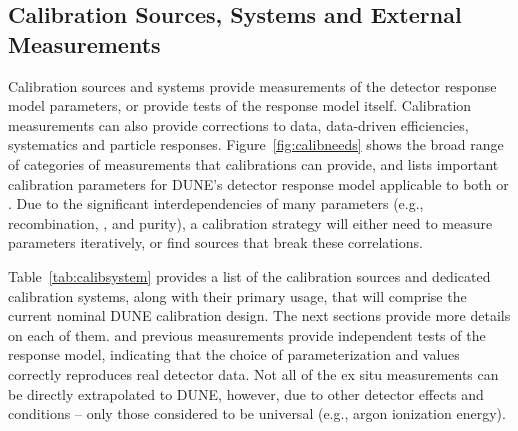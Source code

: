 \subsection{Calibration Sources, Systems and External Measurements}
\label{sec:phys-calib-sources}
Calibration sources and systems provide measurements of the detector response model parameters, or provide tests of the response model itself. Calibration measurements can also provide corrections to data, data-driven efficiencies, systematics and particle responses. 
Figure~\ref{fig:calibneeds} shows the broad range of categories of measurements that calibrations can provide, and lists 
important calibration parameters for DUNE's detector response model applicable to both  or . Due to the significant interdependencies of many parameters (e.g., recombination, \efield, and \lar purity), a calibration strategy will either need to  measure parameters iteratively, or find sources that break these correlations.

Table~\ref{tab:calibsystem} provides a list of the calibration sources and dedicated calibration systems, along with their primary usage, that will comprise the current
nominal DUNE  calibration design. 
The next sections provide more details on each of them.  and previous measurements provide independent tests of the response model, indicating that the choice of parameterization and values correctly reproduces real detector data. 
Not all of the ex situ measurements can be directly extrapolated to DUNE, however, due to other detector effects and conditions -- only those considered to be universal (e.g., argon ionization energy). 


